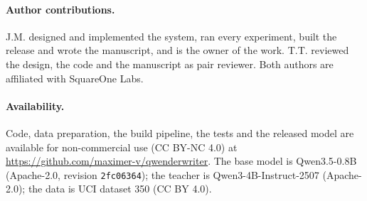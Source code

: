 \documentclass[twocolumn,10pt]{article}
\begin{document}
\paragraph{Author contributions.} J.M. designed and implemented the system, ran every experiment, built the release and wrote the
manuscript, and is the owner of the work. T.T. reviewed the design, the code and the manuscript as pair reviewer. Both
authors are affiliated with SquareOne Labs.

\paragraph{Availability.} Code, data preparation, the build pipeline, the tests and the released model are available for
non-commercial use (CC BY-NC 4.0) at \url{https://github.com/maximer-v/qwenderwriter}. The base model is
Qwen3.5-0.8B~\cite{qwen35,qwen35blog} (Apache-2.0, revision \texttt{2fc06364}); the teacher is Qwen3-4B-Instruct-2507 (Apache-2.0); the data is UCI
dataset 350 (CC BY 4.0).



\end{document}
